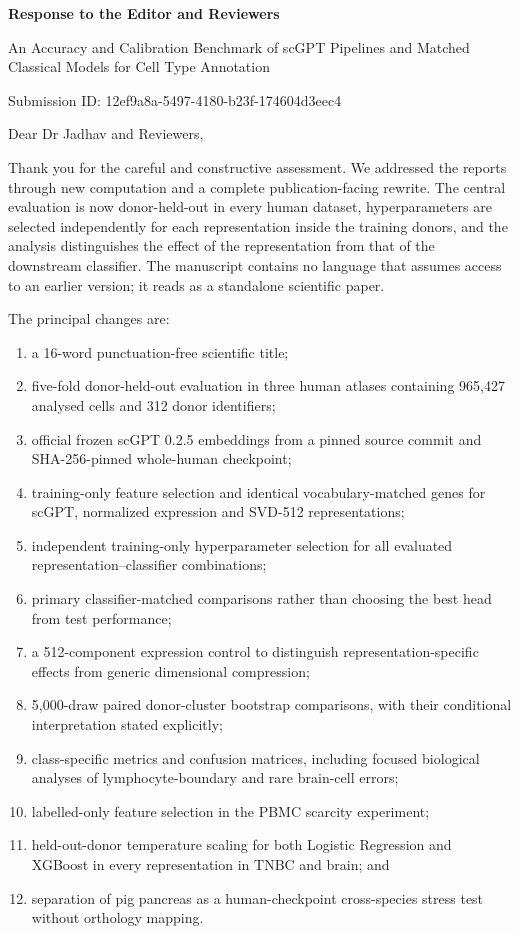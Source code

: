 \documentclass[11pt,a4paper]{article}
\begin{document}
\begin{center}
{\Large\bfseries Response to the Editor and Reviewers\par}
\vspace{8pt}
{\large An Accuracy and Calibration Benchmark of scGPT Pipelines and Matched Classical Models for Cell Type Annotation\par}
\vspace{4pt}
Submission ID: 12ef9a8a-5497-4180-b23f-174604d3eec4
\end{center}

Dear Dr Jadhav and Reviewers,

Thank you for the careful and constructive assessment. We addressed the reports through new computation and a complete publication-facing rewrite. The central evaluation is now donor-held-out in every human dataset, hyperparameters are selected independently for each representation inside the training donors, and the analysis distinguishes the effect of the representation from that of the downstream classifier. The manuscript contains no language that assumes access to an earlier version; it reads as a standalone scientific paper.

The principal changes are:
\begin{enumerate}[leftmargin=*,itemsep=3pt]
\item a 16-word punctuation-free scientific title;
\item five-fold donor-held-out evaluation in three human atlases containing 965,427 analysed cells and 312 donor identifiers;
\item official frozen scGPT 0.2.5 embeddings from a pinned source commit and SHA-256-pinned whole-human checkpoint;
\item training-only feature selection and identical vocabulary-matched genes for scGPT, normalized expression and SVD-512 representations;
\item independent training-only hyperparameter selection for all evaluated representation--classifier combinations;
\item primary classifier-matched comparisons rather than choosing the best head from test performance;
\item a 512-component expression control to distinguish representation-specific effects from generic dimensional compression;
\item 5,000-draw paired donor-cluster bootstrap comparisons, with their conditional interpretation stated explicitly;
\item class-specific metrics and confusion matrices, including focused biological analyses of lymphocyte-boundary and rare brain-cell errors;
\item labelled-only feature selection in the PBMC scarcity experiment;
\item held-out-donor temperature scaling for both Logistic Regression and XGBoost in every representation in TNBC and brain; and
\item separation of pig pancreas as a human-checkpoint cross-species stress test without orthology mapping.
\end{enumerate}
\end{document}
